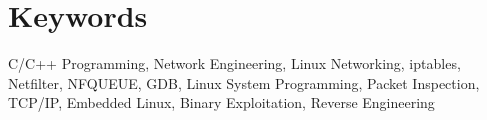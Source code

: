 \section{Keywords}
C/C++ Programming, Network Engineering, Linux Networking, iptables, Netfilter, NFQUEUE, GDB, Linux System Programming, Packet Inspection, TCP/IP, Embedded Linux, Binary Exploitation, Reverse Engineering

